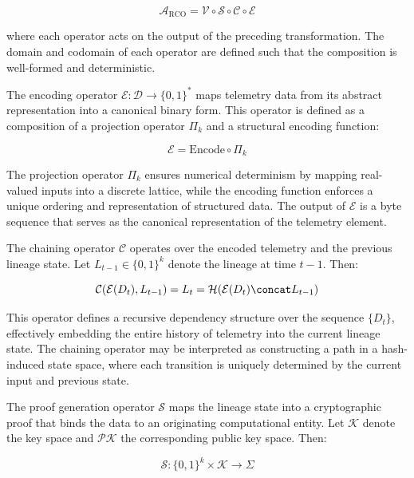 \begin{equation}
\mathcal{A}_{\text{RCO}} = \mathcal{V} \circ \mathcal{S} \circ \mathcal{C} \circ \mathcal{E}
\end{equation}

where each operator acts on the output of the preceding transformation. The domain and codomain of each operator are defined such that the composition is well-formed and deterministic.

The encoding operator $\mathcal{E}: \mathcal{D} \rightarrow \{0,1\}^*$ maps telemetry data from its abstract representation into a canonical binary form. This operator is defined as a composition of a projection operator $\Pi_k$ and a structural encoding function:

\begin{equation}
\mathcal{E} = \text{Encode} \circ \Pi_k
\end{equation}

The projection operator $\Pi_k$ ensures numerical determinism by mapping real-valued inputs into a discrete lattice, while the encoding function enforces a unique ordering and representation of structured data. The output of $\mathcal{E}$ is a byte sequence that serves as the canonical representation of the telemetry element.

The chaining operator $\mathcal{C}$ operates over the encoded telemetry and the previous lineage state. Let $L_{t-1} \in \{0,1\}^k$ denote the lineage at time $t-1$. Then:

\begin{equation}
\mathcal{C}(\mathcal{E}(D_t), L_{t-1}) = L_t = \mathcal{H}(\mathcal{E}(D_t) \concat L_{t-1})
\end{equation}

This operator defines a recursive dependency structure over the sequence $\{D_t\}$, effectively embedding the entire history of telemetry into the current lineage state. The chaining operator may be interpreted as constructing a path in a hash-induced state space, where each transition is uniquely determined by the current input and previous state.

The proof generation operator $\mathcal{S}$ maps the lineage state into a cryptographic proof that binds the data to an originating computational entity. Let $\mathcal{K}$ denote the key space and $\mathcal{PK}$ the corresponding public key space. Then:

\begin{equation}
\mathcal{S}: \{0,1\}^k \times \mathcal{K} \rightarrow \Sigma
\end{equation}

